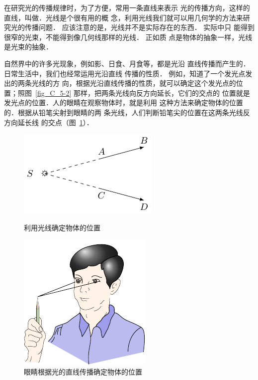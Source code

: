 在研究光的传播规律时，为了方便，常用一条直线来表示
光的传播方向，这样的直线，叫做．光线是个很有用的概
念，利用光线我们就可以用几何学的方法来研究光的传播问题．
应该注意的是，光线并不是实际存在的东西．
实际中只
能得到很窄的光束，不能得到像几何线那样的光线．
正如质
点是物体的抽象一样，光线是光束的抽象．

自然界中的许多光现象，例如影、日食、月食等，都是光沿
直线传播而产生的．日常生活中，我们也经常运用光沿直线
传播的性质．
例如，知道了一个发光点发出的两条光线的方
向，根据光沿直线传播的性质，就可以确定这个发光点的位
置；照图~\ref{fig_C_5-2} 那样，把两条光线向反方向延长，它们的交点的
位置就是发光点的位置．人的眼睛在观察物体时，就是利用
这种方法来确定物体的位置的．根据从铅笔尖射到眼睛的两
条光线，人们判断铅笔尖的位置在这两条光线反方向延长线
的交点（图~\ref{fig_C_5-3}）．
\begin{figure}[htbp]
    \centering
    \begin{minipage}[t]{0.4\textwidth}
        \centering
        \includegraphics{fig/C/5-2.pdf}
        \caption{利用光线确定物体的位置}\label{fig_C_5-2}
    \end{minipage}
    \hfill
    \begin{minipage}[t]{0.55\textwidth}
        \centering
        \includegraphics{fig/C/5-3.pdf}
        \caption{眼睛根据光的直线传播确定物体的位置}\label{fig_C_5-3}
    \end{minipage}
\end{figure}

